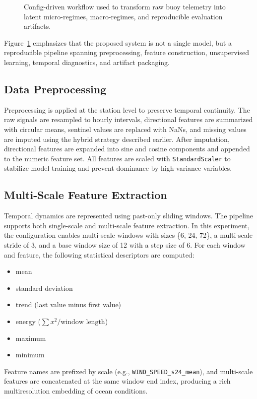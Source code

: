 \documentclass[conference]{IEEEtran}
\begin{document}
\begin{figure}[t]
\centering

\caption{Config-driven workflow used to transform raw buoy telemetry into latent micro-regimes, macro-regimes, and reproducible evaluation artifacts.}
\label{fig:pipeline}
\end{figure}

Figure~\ref{fig:pipeline} emphasizes that the proposed system is not a single model, but a reproducible pipeline spanning preprocessing, feature construction, unsupervised learning, temporal diagnostics, and artifact packaging.

\subsection{Data Preprocessing}
Preprocessing is applied at the station level to preserve temporal continuity. The raw signals are resampled to hourly intervals, directional features are summarized with circular means, sentinel values are replaced with NaNs, and missing values are imputed using the hybrid strategy described earlier. After imputation, directional features are expanded into sine and cosine components and appended to the numeric feature set. All features are scaled with \texttt{StandardScaler} to stabilize model training and prevent dominance by high-variance variables.

\subsection{Multi-Scale Feature Extraction}
Temporal dynamics are represented using past-only sliding windows. The pipeline supports both single-scale and multi-scale feature extraction. In this experiment, the configuration enables multi-scale windows with sizes \{6, 24, 72\}, a multi-scale stride of 3, and a base window size of 12 with a step size of 6. For each window and feature, the following statistical descriptors are computed:
\begin{itemize}
\item mean
\item standard deviation
\item trend (last value minus first value)
\item energy ($\sum x^2 / \text{window length}$)
\item maximum
\item minimum
\end{itemize}
Feature names are prefixed by scale (e.g., \texttt{WIND\_SPEED\_s24\_mean}), and multi-scale features are concatenated at the same window end index, producing a rich multiresolution embedding of ocean conditions.
\end{document}
